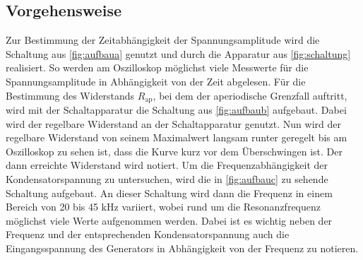 \subsection{Vorgehensweise}
Zur Bestimmung der Zeitabhängigkeit der Spannungsamplitude wird die Schaltung aus
\autoref{fig:aufbaua} genutzt und durch die Apparatur aus \autoref{fig:schaltung}
realisiert. So werden am Oszilloskop möglichst viele Messwerte für die Spannungsamplitude
in Abhängigkeit von der Zeit abgelesen. 
\newline
Für die Bestimmung des Widerstands
$R_{\text{ap}}$, bei dem der aperiodische Grenzfall auftritt, wird mit der Schaltapparatur
die Schaltung aus \autoref{fig:aufbaub} aufgebaut. Dabei wird der regelbare Widerstand an
der Schaltapparatur genutzt. Nun wird der regelbare Widerstand von seinem Maximalwert
langsam runter geregelt bis am Oszilloskop zu sehen ist, dass die Kurve kurz vor dem
Überschwingen ist. Der dann erreichte Widerstand wird notiert.
\newline 
Um die Frequenzabhängigkeit der Kondensatorspannung zu
untersuchen, wird die in \autoref{fig:aufbauc} zu sehende Schaltung aufgebaut. An dieser
Schaltung wird dann die Frequenz in einem Bereich von 20 bis 45 kHz variiert, wobei rund
um die Resonanzfrequenz möglichst viele Werte aufgenommen werden. Dabei ist es wichtig
neben der Frequenz und der entsprechenden Kondensatorspannung auch die Eingangsspannung
des Generators in Abhängigkeit von der Frequenz zu notieren.
